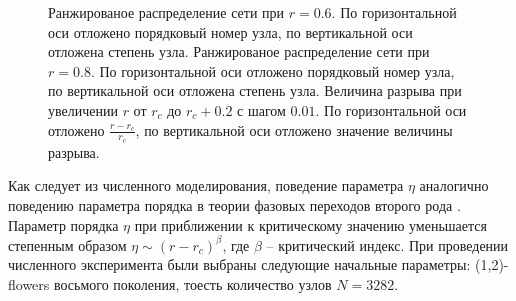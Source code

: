 \documentclass[10pt,aps,pra]{revtex4-1}
\begin{document}
\begin{figure}[H]  

\centering
{}  

\caption{
\label{fig:flowerRank}
 Ранжированое распределение сети при $r=0.6$. По горизонтальной оси отложено порядковый номер узла, по вертикальной оси отложена степень узла.
 Ранжированое распределение сети при $r=0.8$. По горизонтальной оси отложено порядковый номер узла, по вертикальной оси отложена степень узла.
 Величина разрыва при увеличении $r$ от $r_c$ до $r_c + 0.2$ с шагом $0.01$. По горизонтальной оси отложено $\frac{r-r_c}{r_c}$, по вертикальной оси отложено значение величины разрыва.
}
\end{figure}

Как следует из численного моделирования, поведение параметра $\eta$ аналогично поведению параметра порядка в теории фазовых переходов второго рода \cite{Landau}. Параметр порядка $\eta$ при приближении к критическому значению уменьшается степенным образом $\eta \sim (r-r_c)^\beta$, где $\beta$ – критический индекс. 
При проведении численного эксперимента были выбраны следующие начальные параметры: (1,2)-flowers восьмого поколения, тоесть количество узлов $N=3282$.
\end{document}
